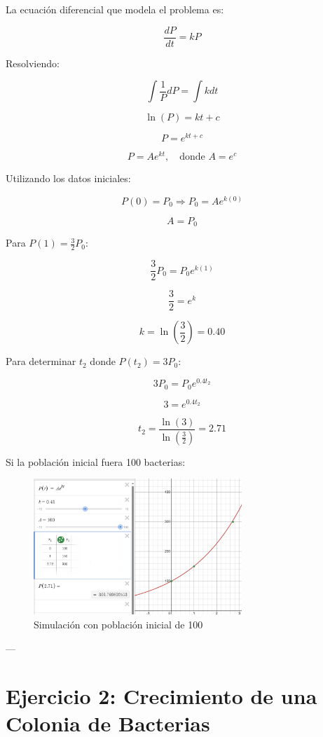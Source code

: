 La ecuación diferencial que modela el problema es:

\[
\frac{dP}{dt} = kP
\]

Resolviendo:

\[
\int \frac{1}{P} dP = \int k dt
\]

\[
\ln(P) = kt + c
\]

\[
P = e^{kt+c}
\]

\[
P = A e^{kt}, \quad \text{donde } A = e^c
\]

Utilizando los datos iniciales:

\[
P(0) = P_{0} \Rightarrow P_{0} = A e^{k(0)}
\]

\[
A = P_{0}
\]

Para \( P(1) = \frac{3}{2} P_{0} \):

\[
\frac{3}{2} P_{0} = P_{0} e^{k(1)}
\]

\[
\frac{3}{2} = e^k
\]

\[
k = \ln\left(\frac{3}{2}\right) = 0.40
\]

Para determinar \( t_2 \) donde \( P(t_2) = 3P_{0} \):

\[
3 P_{0} = P_{0} e^{0.4t_{2}}
\]

\[
3 = e^{0.4t_{2}}
\]

\[
t_{2} = \frac{\ln(3)}{\ln\left(\frac{3}{2}\right)} = 2.71
\]

Si la población inicial fuera 100 bacterias:

\begin{figure}[H]
    \centering
    \includegraphics[width=0.7\textwidth]{images/Modelado 03.png}
    \caption{Simulación con población inicial de 100}
\end{figure}

---

\section*{Ejercicio 2: Crecimiento de una Colonia de Bacterias}

